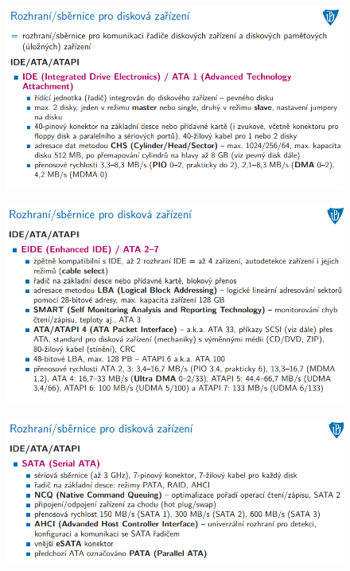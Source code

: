 \documentclass[10pt,a4paper]{article}
\begin{document}
\begin{figure} [h]
	\includegraphics[scale=0.65]{img/prvni_odstavec/otazka4/rozhrani_vnitrni1.png}	
\end{figure}

\begin{figure} [h]
	\includegraphics[scale=0.65]{img/prvni_odstavec/otazka4/rozhrani_vnitrni2.png}	
\end{figure}

\begin{figure} [h]
	\includegraphics[scale=0.65]{img/prvni_odstavec/otazka4/rozhrani_vnitrni3.png}	
\end{figure}
\end{document}
